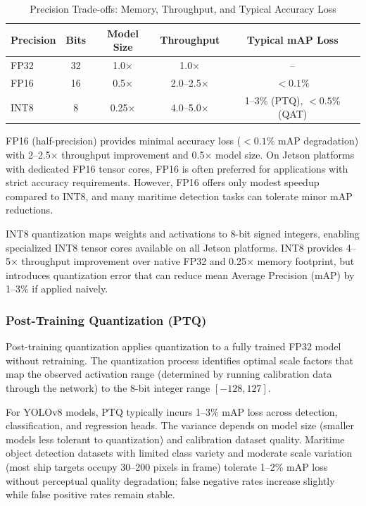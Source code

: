 \begin{table}[h]
\centering
\caption{Precision Trade-offs: Memory, Throughput, and Typical Accuracy Loss}
\label{tab:quantization_precision}
\begin{tabular}{lcccc}
\toprule
\textbf{Precision} & \textbf{Bits} & \textbf{Model Size} & \textbf{Throughput} & \textbf{Typical mAP Loss} \\
\midrule
FP32 & 32 & 1.0× & 1.0× & -- \\
FP16 & 16 & 0.5× & 2.0--2.5× & $< 0.1\%$ \\
INT8 & 8 & 0.25× & 4.0--5.0× & 1--3\% (PTQ), $< 0.5\%$ (QAT) \\
\bottomrule
\end{tabular}
\end{table}

FP16 (half-precision) provides minimal accuracy loss ($< 0.1\%$ mAP degradation) with 2--2.5× throughput improvement and 0.5× model size. On Jetson platforms with dedicated FP16 tensor cores, FP16 is often preferred for applications with strict accuracy requirements. However, FP16 offers only modest speedup compared to INT8, and many maritime detection tasks can tolerate minor mAP reductions.

INT8 quantization maps weights and activations to 8-bit signed integers, enabling specialized INT8 tensor cores available on all Jetson platforms. INT8 provides 4--5× throughput improvement over native FP32 and 0.25× memory footprint, but introduces quantization error that can reduce mean Average Precision (mAP) by 1--3\% if applied naively.

\subsubsection{Post-Training Quantization (PTQ)}

Post-training quantization applies quantization to a fully trained FP32 model without retraining. The quantization process identifies optimal scale factors that map the observed activation range (determined by running calibration data through the network) to the 8-bit integer range $[-128, 127]$.

For YOLOv8 models, PTQ typically incurs 1--3\% mAP loss across detection, classification, and regression heads. \cite{Zhou2023INT8Quantization} The variance depends on model size (smaller models less tolerant to quantization) and calibration dataset quality. Maritime object detection datasets with limited class variety and moderate scale variation (most ship targets occupy 30--200 pixels in frame) tolerate 1--2\% mAP loss without perceptual quality degradation; false negative rates increase slightly while false positive rates remain stable.

